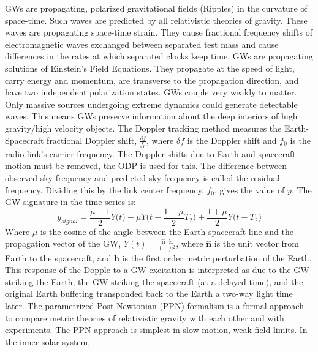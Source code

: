 \documentclass{article}
\begin{document}
            \noindent GWs are propagating, polarized gravitational fields (Ripples) in the curvature of space-time. Such waves are predicted by all relativistic theories of gravity. These waves are propagating space-time strain. They cause fractional frequency shifts of electromagnetic waves exchanged between separated test mass and cause differences in the rates at which separated clocks keep time. GWs are propagating solutions of Einstein's Field Equations. They propagate at the speed of light, carry energy and momentum, are transverse to the propagation direction, and have two independent polarization states. GWs couple very weakly to matter. Only massive sources undergoing extreme dynamics could generate detectable waves. This means GWs preserve information about the deep interiors of high gravity/high velocity objects. The Doppler tracking method measures the Earth-Spacecraft fractional Doppler shift, $\frac{\delta f}{f_0}$, where $\delta f$ is the Doppler shift and $f_0$ is the radio link's carrier frequency. The Doppler shifts due to Earth and spacecraft motion must be removed, the ODP is used for this. The difference between observed sky frequency and predicted sky frequency is called the residual frequency. Dividing this by the link center frequency, $f_0$, gives the value of $y$. The GW signature in the time series is:
            \begin{equation}
                y_{signal}=\frac{\mu-1}{2}Y\big(t\big)-
                           \mu Y\big(t-\frac{1+\mu}{2}T_2\big)
                          +\frac{1+\mu}{2}Y\big(t-T_2\big)
            \end{equation}
            Where $\mu$ is the cosine of the angle between the
            Earth-spacecraft line and the propagation vector of the GW, $Y(t)
            = \frac{\hat{\mathbf{n}}\cdot \mathbf{h}}{1-\mu^2}$, where
            $\hat{\mathbf{n}}$ is the unit vector from Earth to the
            spacecraft, and $\mathbf{h}$ is the first order metric
            perturbation of the Earth. This response of the Dopple to a GW
            excitation is interpreted as due to the GW striking the Earth, the
            GW striking the spacecraft (at a delayed time), and the original
            Earth buffeting transponded back to the Earth a two-way light time
            later. The parametrized Post Newtonian (PPN) formalism is a formal
            approach to compare metric theories of relativistic gravity with
            each other and with experiments. The PPN approach is simplest in
            slow motion, weak field limits. In the inner solar system,
\end{document}
